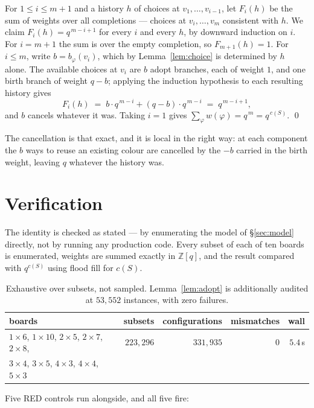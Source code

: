 \documentclass[11pt]{article}
\newcommand{\Z}{\mathbb{Z}}
\begin{document}
For $1 \le i \le m+1$ and a history $h$ of choices at $v_1, \dots, v_{i-1}$, let
$F_i(h)$ be the sum of weights over all completions --- choices at
$v_i, \dots, v_m$ consistent with $h$. We claim $F_i(h) = q^{\,m-i+1}$ for every
$i$ and every $h$, by downward induction on $i$. For $i = m+1$ the sum is over
the empty completion, so $F_{m+1}(h) = 1$. For $i \le m$, write
$b = b_\varphi(v_i)$, which by Lemma~\ref{lem:choice} is determined by $h$
alone. The available choices at $v_i$ are $b$ adopt branches, each of weight $1$,
and one birth branch of weight $q - b$; applying the induction hypothesis to each
resulting history gives
\[
  F_i(h) \;=\; b \cdot q^{\,m-i} + (q-b)\cdot q^{\,m-i} \;=\; q^{\,m-i+1},
\]
and $b$ cancels whatever it was. Taking $i = 1$ gives
$\sum_\varphi w(\varphi) = q^{\,m} = q^{\,c(S)}$. \qed

The cancellation is that exact, and it is local in the right way: at each
component the $b$ ways to reuse an existing colour are cancelled by the $-b$
carried in the birth weight, leaving $q$ whatever the history was.

\section{Verification}
\label{sec:verify}

The identity is checked as stated --- by enumerating the model of
\S\ref{sec:model} directly, not by running any production code. Every subset of
each of ten boards is enumerated, weights are summed exactly in $\Z[q]$, and the
result compared with $q^{c(S)}$ using flood fill for $c(S)$.

\begin{table}[H]
\centering\small
\begin{tabular}{l r r r r}
\toprule
boards & subsets & configurations & mismatches & wall \\
\midrule
$1{\times}6$, $1{\times}10$, $2{\times}5$, $2{\times}7$, $2{\times}8$,
 & $223{,}296$ & $331{,}935$ & $0$ & $5.4$\,s \\
$3{\times}4$, $3{\times}5$, $4{\times}3$, $4{\times}4$, $5{\times}3$ & & & & \\
\bottomrule
\end{tabular}
\caption{Exhaustive over subsets, not sampled. Lemma~\ref{lem:adopt} is
additionally audited at $53{,}552$ instances, with zero failures.}
\label{tab:verify}
\end{table}

Five RED controls run alongside, and all five fire:
\end{document}
